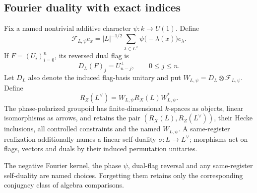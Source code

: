 \subsection{Fourier duality with exact indices}

\begin{definition}
Fix a named nontrivial additive character $\psi:k\to U(1)$.  Define
\[
 \mathcal F_{L,\psi}e_x
   =|L|^{-1/2}\sum_{\lambda\in L^\vee}
       \psi\bigl(-\lambda(x)\bigr)e_\lambda.
\]
If $F=(U_i)_{i=0}^n$, its reversed dual flag is
\[
 D_L(F)_j=U_{n-j}^{\perp},\qquad 0\leq j\leq n.
\]
Let $D_L$ also denote the induced flag-basis unitary and put
$W_{L,\psi}=D_L\otimes\mathcal F_{L,\psi}$.  Define
\[
 R_Z(L^\vee)=W_{L,\psi}R_X(L)W_{L,\psi}^*.
\]
The phase-polarized groupoid has finite-dimensional $k$-spaces as objects,
linear isomorphisms as arrows, and retains the pair $(R_X(L),R_Z(L^\vee))$,
their Hecke inclusions, all controlled constraints and the named $W_{L,\psi}$.
A same-register realization additionally names a linear self-duality
$\sigma:L\to L^\vee$; morphisms act on flags, vectors and duals by their
induced permutation unitaries.
\end{definition}
\begin{scope}
The negative Fourier kernel, the phase $\psi$, dual-flag reversal and any
same-register self-duality are named choices.  Forgetting them retains only
the corresponding conjugacy class of algebra comparisons.
\end{scope}

